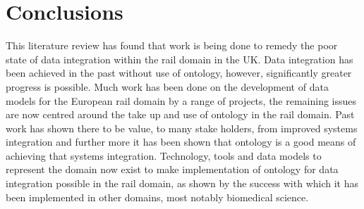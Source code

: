 \section{Conclusions}

This literature review has found that work is being done to remedy the poor state of data integration within the rail domain in the UK. Data integration has been achieved in the past without use of ontology, however, significantly greater progress is possible. Much work has been done on the development of data models for the European rail domain by a range of projects, the remaining issues are now centred around the take up and use of ontology in the rail domain. Past work has shown there to be value, to many stake holders, from improved systems integration and further more it has been shown that ontology is a good means of achieving that systems integration.  Technology, tools and data models to represent the domain now exist to make implementation of ontology for data integration possible in the rail domain, as shown by the success with which it has been implemented in other domains, most notably biomedical science. 